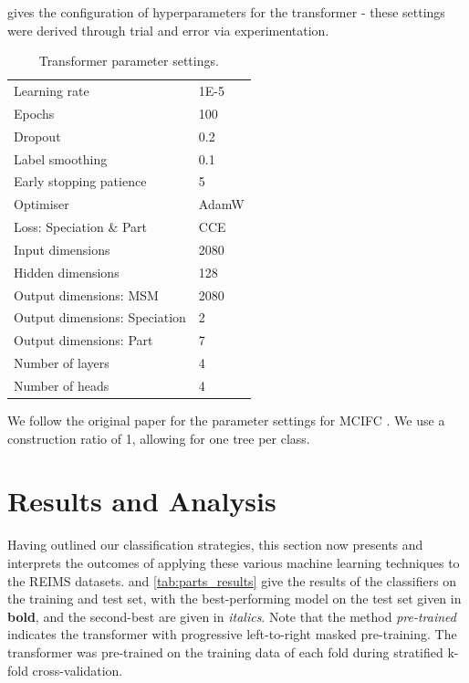  gives the configuration of hyperparameters for the transformer - these settings were derived through trial and error via experimentation.

\begin{table}[t]
    \caption{Transformer parameter settings.}
    \centering
    \begin{tabular}{ l l }
        \hline
        Learning rate & 1E-5 \\ 
        Epochs & 100 \\
        Dropout & 0.2 \\
        Label smoothing & 0.1 \\
        Early stopping patience & 5 \\
        Optimiser & AdamW \\
        Loss: Speciation \& Part & CCE \\
        Input dimensions & 2080 \\ 
        Hidden dimensions & 128 \\
        Output dimensions: MSM & 2080 \\
        Output dimensions: Speciation & 2 \\
        Output dimensions: Part & 7 \\
        Number of layers & 4 \\
        Number of heads  & 4 \\
        \hline
    \end{tabular}
    \label{tab:transformer-parameters}
\end{table}

We follow the original paper for the parameter settings for MCIFC \citep{Tran2019}. We use a construction ratio of 1, allowing for one tree per class.

\section{Results and Analysis}
\label{sec:results-and-discusssion}

Having outlined our classification strategies, this section now presents and interprets the outcomes of applying these various machine learning techniques to the REIMS datasets.  and \cref{tab:parts_results} give the results of the classifiers on the training and test set, with the best-performing model on the test set given in \textbf{bold}, and the second-best are given in \textit{italics}. 
Note that the method \textit{pre-trained} indicates the transformer with progressive left-to-right masked pre-training. The transformer was pre-trained on the training data of each fold during stratified k-fold cross-validation.

